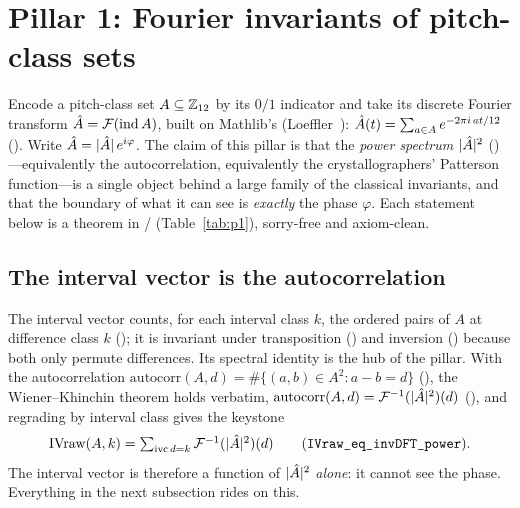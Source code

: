 
\section{Pillar 1: Fourier invariants of pitch-class sets}\label{sec:pillar1}


Encode a pitch-class set $A\subseteq\mathbb{Z}_{12}$ by its $0/1$ indicator and take its discrete
Fourier transform $\hat{A}=\mathcal{F}(\mathrm{ind}\,A)$, built on Mathlib's 
(Loeffler~\cite{Loeffler}): $\hat{A}(t)=\sum_{a\in A}e^{-2\pi i\,at/12}$ (). Write
$\hat{A}=|\hat{A}|\,e^{i\varphi}$. The claim of this pillar is that the \emph{power spectrum}
$|\hat{A}|^2$ ()---equivalently the autocorrelation, equivalently the
crystallographers' Patterson function---is a single object behind a large family of the classical
invariants, and that the boundary of what it can see is \emph{exactly} the phase $\varphi$. Each
statement below is a theorem in /
(Table~\ref{tab:p1}), sorry-free and axiom-clean.

\subsection{The interval vector is the autocorrelation}\label{sec:p1-ivkey}


The interval vector counts, for each interval class $k$, the ordered pairs of $A$ at difference
class $k$ (); it is invariant under transposition () and inversion
() because both only permute differences. Its spectral identity is the hub of
the pillar. With the autocorrelation $\mathrm{autocorr}(A,d)=\#\{(a,b)\in A^2:a-b=d\}$
(), the Wiener--Khinchin theorem holds verbatim,
$\mathrm{autocorr}(A,d)=\mathcal{F}^{-1}(|\hat{A}|^2)(d)$ (), and regrading by
interval class gives the keystone
\[
  \mathrm{IVraw}(A,k)=\textstyle\sum_{\mathrm{ivc}\,d=k}\mathcal{F}^{-1}(|\hat{A}|^2)(d)
  \qquad(\texttt{IVraw\_eq\_invDFT\_power}).
\]
The interval vector is therefore a function of $|\hat{A}|^2$ \emph{alone}: it cannot see the phase.
Everything in the next subsection rides on this.

